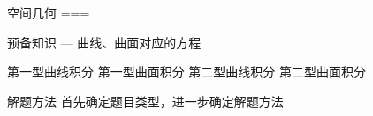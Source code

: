 \begin{markdown}
	
空间几何
===

预备知识
---
曲线、曲面对应的方程

第一型曲线积分
第一型曲面积分
第二型曲线积分
第二型曲面积分

解题方法
首先确定题目类型，进一步确定解题方法

\end{markdown}
